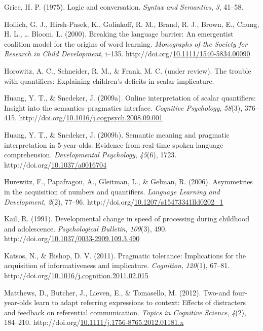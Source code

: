 \documentclass[a4paper,man,apacite,floatsintext]{apa6}
\begin{document}
Grice, H. P. (1975). Logic and conversation. \emph{Syntax and
Semantics}, \emph{3}, 41--58.

Hollich, G. J., Hirsh-Pasek, K., Golinkoff, R. M., Brand, R. J., Brown,
E., Chung, H. L., \ldots{} Bloom, L. (2000). Breaking the language
barrier: An emergentist coalition model for the origins of word
learning. \emph{Monographs of the Society for Research in Child
Development}, i--135.
http://doi.org/\href{http://dx.doi.org/10.1111/1540-5834.00090}{10.1111/1540-5834.00090}

Horowitz, A. C., Schneider, R. M., \& Frank, M. C. (under review). The
trouble with quantifiers: Explaining children's deficits in scalar
implicature.

Huang, Y. T., \& Snedeker, J. (2009a). Online interpretation of scalar
quantifiers: Insight into the semantics--pragmatics interface.
\emph{Cognitive Psychology}, \emph{58}(3), 376--415.
http://doi.org/\href{http://dx.doi.org/10.1016/j.cogpsych.2008.09.001}{10.1016/j.cogpsych.2008.09.001}

Huang, Y. T., \& Snedeker, J. (2009b). Semantic meaning and pragmatic
interpretation in 5-year-olds: Evidence from real-time spoken language
comprehension. \emph{Developmental Psychology}, \emph{45}(6), 1723.
http://doi.org/\href{http://dx.doi.org/10.1037/a0016704}{10.1037/a0016704}

Hurewitz, F., Papafragou, A., Gleitman, L., \& Gelman, R. (2006).
Asymmetries in the acquisition of numbers and quantifiers.
\emph{Language Learning and Development}, \emph{2}(2), 77--96.
http://doi.org/\href{http://dx.doi.org/10.1207/s15473341lld0202_1}{10.1207/s15473341lld0202\_1}

Kail, R. (1991). Developmental change in speed of processing during
childhood and adolescence. \emph{Psychological Bulletin}, \emph{109}(3),
490.
http://doi.org/\href{http://dx.doi.org/10.1037/0033-2909.109.3.490}{10.1037/0033-2909.109.3.490}

Katsos, N., \& Bishop, D. V. (2011). Pragmatic tolerance: Implications
for the acquisition of informativeness and implicature.
\emph{Cognition}, \emph{120}(1), 67--81.
http://doi.org/\href{http://dx.doi.org/10.1016/j.cognition.2011.02.015}{10.1016/j.cognition.2011.02.015}

Matthews, D., Butcher, J., Lieven, E., \& Tomasello, M. (2012). Two-and
four-year-olds learn to adapt referring expressions to context: Effects
of distracters and feedback on referential communication. \emph{Topics
in Cognitive Science}, \emph{4}(2), 184--210.
http://doi.org/\href{http://dx.doi.org/10.1111/j.1756-8765.2012.01181.x}{10.1111/j.1756-8765.2012.01181.x}
\end{document}
